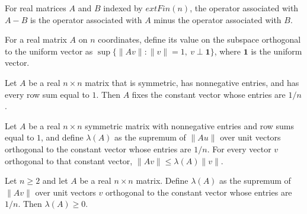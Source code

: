 \begin{theorem}
\label{Expander.toCLM_sub}
\leanok
{}
For real matrices $A$ and $B$ indexed by $	ext{Fin}(n)$, the operator associated with
$A-B$ is the operator associated with $A$ minus the operator associated with $B$.
\end{theorem}

\begin{definition}
\label{Expander.lambda}
\leanok
{}
For a real matrix $A$ on $n$ coordinates, define its value on the subspace orthogonal to
the uniform vector as $\sup\{\|Av\| : \|v\|=1,\ v\perp\mathbf{1}\}$, where $\mathbf{1}$ is the
uniform vector.
\end{definition}

\begin{theorem}
\label{Expander.mulVec_uniform}
\leanok
{}
Let $A$ be a real $n\times n$ matrix that is symmetric, has nonnegative entries, and has
every row sum equal to $1$. Then $A$ fixes the constant vector whose entries are $1/n$.
\end{theorem}

\begin{theorem}
\label{Expander.norm_mulVec_le_lambda}
\leanok
{}
Let $A$ be a real $n\times n$ symmetric matrix with nonnegative entries and row sums
equal to $1$, and define $\lambda(A)$ as the supremum of $\|Au\|$ over unit vectors
orthogonal to the constant vector whose entries are $1/n$. For every vector $v$
orthogonal to that constant vector, $\|Av\|\le \lambda(A)\|v\|$.
\end{theorem}

\begin{theorem}
\label{Expander.lambda_nonneg}
\leanok
{}
Let $n\ge 2$ and let $A$ be a real $n\times n$ matrix. Define $\lambda(A)$ as the
supremum of $\|Av\|$ over unit vectors $v$ orthogonal to the constant vector whose
entries are $1/n$. Then $\lambda(A)\ge 0$.
\end{theorem}

